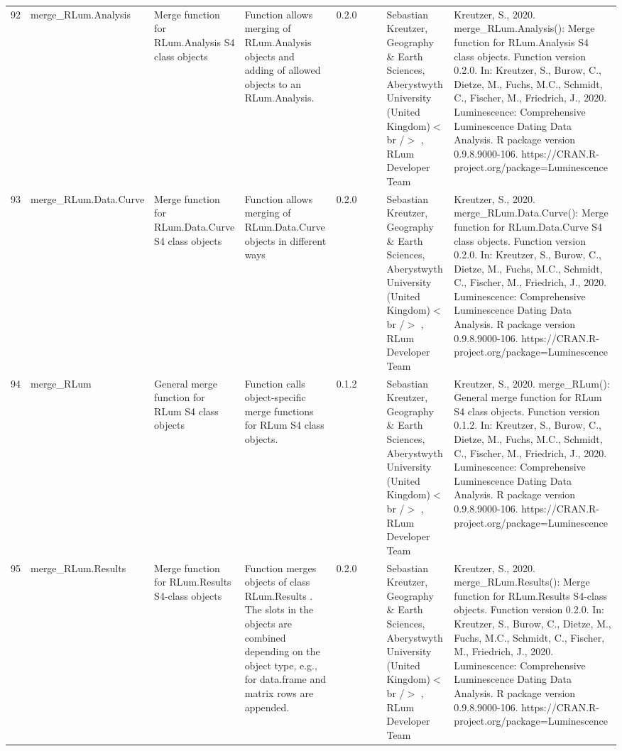 \begin{table}[ht]
\begin{tabular}{rllllllll}
 \\ 
  92 & merge\_RLum.Analysis & Merge function for RLum.Analysis S4 class objects & Function allows merging of RLum.Analysis objects and adding of allowed objects to an RLum.Analysis. & 0.2.0
 &  &  & Sebastian Kreutzer, Geography \& Earth Sciences, Aberystwyth University (United Kingdom)$<$br /$>$ , RLum Developer Team & Kreutzer, S., 2020. merge\_RLum.Analysis(): Merge function for RLum.Analysis S4 class objects. Function version 0.2.0. In: Kreutzer, S., Burow, C., Dietze, M., Fuchs, M.C., Schmidt, C., Fischer, M., Friedrich, J., 2020. Luminescence: Comprehensive Luminescence Dating Data Analysis. R package version 0.9.8.9000-106. https://CRAN.R-project.org/package=Luminescence
 \\ 
  93 & merge\_RLum.Data.Curve & Merge function for RLum.Data.Curve S4 class objects & Function allows merging of RLum.Data.Curve objects in different ways & 0.2.0
 &  &  & Sebastian Kreutzer, Geography \& Earth Sciences, Aberystwyth University (United Kingdom)$<$br /$>$ , RLum Developer Team & Kreutzer, S., 2020. merge\_RLum.Data.Curve(): Merge function for RLum.Data.Curve S4 class objects. Function version 0.2.0. In: Kreutzer, S., Burow, C., Dietze, M., Fuchs, M.C., Schmidt, C., Fischer, M., Friedrich, J., 2020. Luminescence: Comprehensive Luminescence Dating Data Analysis. R package version 0.9.8.9000-106. https://CRAN.R-project.org/package=Luminescence
 \\ 
  94 & merge\_RLum & General merge function for RLum S4 class objects & Function calls object-specific merge functions for RLum S4 class objects. & 0.1.2
 &  &  & Sebastian Kreutzer, Geography \& Earth Sciences, Aberystwyth University (United Kingdom)$<$br /$>$ , RLum Developer Team & Kreutzer, S., 2020. merge\_RLum(): General merge function for RLum S4 class objects. Function version 0.1.2. In: Kreutzer, S., Burow, C., Dietze, M., Fuchs, M.C., Schmidt, C., Fischer, M., Friedrich, J., 2020. Luminescence: Comprehensive Luminescence Dating Data Analysis. R package version 0.9.8.9000-106. https://CRAN.R-project.org/package=Luminescence
 \\ 
  95 & merge\_RLum.Results & Merge function for RLum.Results S4-class objects & Function merges objects of class  RLum.Results . The slots in the objects are combined depending on the object type, e.g., for  data.frame  and  matrix  rows are appended. & 0.2.0
 &  &  & Sebastian Kreutzer, Geography \& Earth Sciences, Aberystwyth University (United Kingdom)$<$br /$>$ , RLum Developer Team & Kreutzer, S., 2020. merge\_RLum.Results(): Merge function for RLum.Results S4-class objects. Function version 0.2.0. In: Kreutzer, S., Burow, C., Dietze, M., Fuchs, M.C., Schmidt, C., Fischer, M., Friedrich, J., 2020. Luminescence: Comprehensive Luminescence Dating Data Analysis. R package version 0.9.8.9000-106. https://CRAN.R-project.org/package=Luminescence

\end{tabular}
\end{table}
